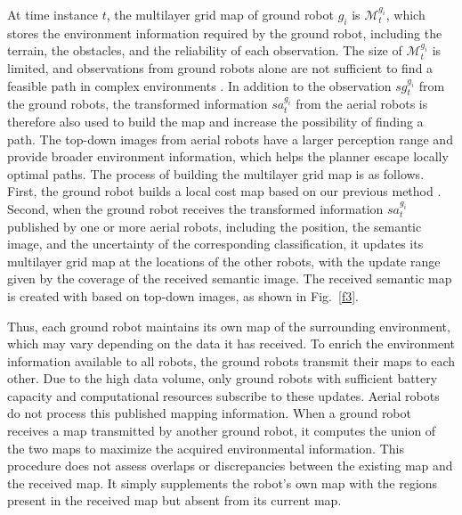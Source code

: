At time instance $t$, the multilayer grid map of ground robot $g_i$ is $\mathcal{M}^{g_i}_t$, which stores the environment information required by the ground robot, including the terrain, the obstacles, and the reliability of each observation. The size of $\mathcal{M}^{g_i}_t$ is limited, and observations from ground robots alone are not sufficient to find a feasible path in complex environments \cite{xx}. In addition to the observation $sg_t^{g_i}$ from the ground robots, the transformed information $sa_t^{g_i}$ from the aerial robots is therefore also used to build the map and increase the possibility of finding a path. The top-down images from aerial robots have a larger perception range and provide broader environment information, which helps the planner escape locally optimal paths. The process of building the multilayer grid map is as follows. First, the ground robot builds a local cost map based on our previous method \cite{10611055}. Second, when the ground robot receives the transformed information $sa_t^{g_i}$ published by one or more aerial robots, including the position, the semantic image, and the uncertainty of the corresponding classification, it updates its multilayer grid map at the locations of the other robots, with the update range given by the coverage of the received semantic image. The received semantic map is created with \cite{umar2021forest} based on top-down images, as shown in Fig.~\ref{f3}.

Thus, each ground robot maintains its own map of the surrounding environment, which may vary depending on the data it has received. To enrich the environment information available to all robots, the ground robots transmit their maps to each other. Due to the high data volume, only ground robots with sufficient battery capacity and computational resources subscribe to these updates. Aerial robots do not process this published mapping information. When a ground robot receives a map transmitted by another ground robot, it computes the union of the two maps to maximize the acquired environmental information. This procedure does not assess overlaps or discrepancies between the existing map and the received map. It simply supplements the robot's own map with the regions present in the received map but absent from its current map.


